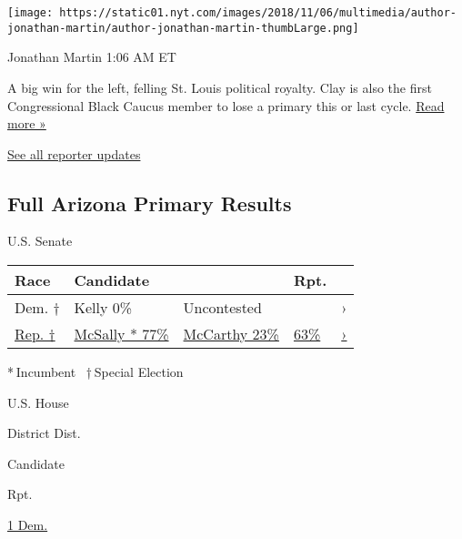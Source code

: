 \texttt{[image: https://static01.nyt.com/images/2018/11/06/multimedia/author-jonathan-martin/author-jonathan-martin-thumbLarge.png]}

Jonathan Martin 1:06 AM ET

A big win for the left, felling St. Louis political royalty. Clay is
also the first Congressional Black Caucus member to lose a primary this
or last cycle.
\href{https://www.nytimes.com/2020/08/05/us/politics/cori-bush-missouri-william-lacy-clay.html?action=click\&module=ELEX_results\&pgtype=Interactive\&region=ReporterUpdates}{Read
more »}

\href{https://www.nytimes.com/interactive/2020/08/04/us/elections/live-analysis-arizona-kansas-michigan-missouri-primaries.html?action=click\&module=ELEX_results\&pgtype=Interactive\&region=Component}{See
all reporter updates}

\hypertarget{full-arizona-primary-results}{%
\subsection{Full Arizona Primary
Results}\label{full-arizona-primary-results}}

U.S. Senate

\begin{longtable}[]{@{}lllll@{}}
\toprule
Race & Candidate & & Rpt. &\tabularnewline
\midrule
\endhead
Dem. † & Kelly 0\% & Uncontested & & ›\tabularnewline
\href{https://www.nytimes.com/interactive/2020/08/04/us/elections/results-arizona-senate-special-primary-election.html}{Rep.
†} &
\href{https://www.nytimes.com/interactive/2020/08/04/us/elections/results-arizona-senate-special-primary-election.html}{
McSally * 77\% } &
\href{https://www.nytimes.com/interactive/2020/08/04/us/elections/results-arizona-senate-special-primary-election.html}{
McCarthy 23\% } &
\href{https://www.nytimes.com/interactive/2020/08/04/us/elections/results-arizona-senate-special-primary-election.html}{63\%}
&
\href{https://www.nytimes.com/interactive/2020/08/04/us/elections/results-arizona-senate-special-primary-election.html}{›}\tabularnewline
\bottomrule
\end{longtable}

* Incumbent~ † Special Election

U.S. House

District Dist.

Candidate

Rpt.

\href{https://www.nytimes.com/interactive/2020/08/04/us/elections/results-arizona-house-district-1-primary-election.html}{1
Dem.}

